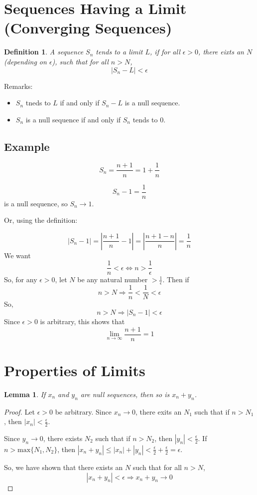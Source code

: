 \documentclass[12pt]{scrbook}
\newtheorem*{definition}{Definition}
\newtheorem{lemma}{Lemma}[section]
\begin{document}
\section{Sequences Having a Limit (Converging Sequences)}

\begin{definition}
A sequence $S_n$ tends to a limit $L$, if for all $\epsilon > 0$, there eixts an $N$ (depending on $\epsilon$), such that for 
all $n > N$, 
\[ \left| S_n - L \right| < \epsilon \]
\end{definition}

Remarks:
\begin{itemize}
\item $S_n$ tneds to $L$ if and only if $S_n - L$ is a null sequence.
\item $S_n$ is a null sequence if and only if $S_n$ tends to 0.
\end{itemize}

\subsection{Example}
\[ S_n = \frac{n+1}{n} = 1 + \frac{1}{n} \]

\[ S_n - 1 = \frac{1}{n} \]
is a null sequence, so $S_n \rightarrow 1$.

Or, using the definition:

\[ \left|S_n - 1 \right| = \left| \frac{n+1}{n} - 1 \right| = \left| \frac{n+1-n}{n} \right| = \frac{1}{n} \]
We want
\[ \frac{1}{n} < \epsilon \Leftrightarrow n > \frac{1}{\epsilon} \]
So, for any $\epsilon > 0$, let $N$ be any natural number $> \frac{1}{\epsilon}$.  Then if 
\[ n > N \Rightarrow \frac{1}{n} < \frac{1}{N} < \epsilon \]
So, 
\[ n > N \Rightarrow \left|  S_n - 1 \right| < \epsilon \]
Since $\epsilon > 0$ is arbitrary, this shows that
\[ \lim_{n \to \infty} \frac{n+1}{n} = 1 \]


\section{Properties of Limits}

\begin{lemma}
\label{lemma-lim-1}
If $x_n$ and $y_n$ are null sequences, then so is $x_n + y_n$.
\end{lemma}

\begin{proof}
Let $\epsilon > 0$ be arbitrary.  Since $x_n \rightarrow 0$, there exits an $N_1$ such that if $n > N_1$, then 
$|x_n| < \frac{\epsilon}{2}$.

Since $y_n \rightarrow 0$, there exists $N_2$ such that if $n > N_2$, then $|y_n| < \frac{\epsilon}{2}$. If 
$n > \text{max}\{N_1, N_2\}$, then $\left| x_n + y_n \right| \le |x_n| + |y_n| < \frac{\epsilon}{2} + \frac{\epsilon}{2} = \epsilon$.

So, we have shown that there exists an $N$ such that for all $n > N$, 
\[ \left| x_n + y_n \right| < \epsilon \Rightarrow x_n + y_n \rightarrow 0 \]
\end{proof}
\end{document}
